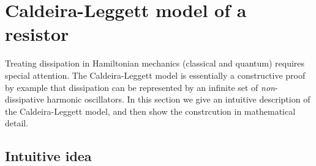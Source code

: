 \section{Caldeira-Leggett model of a resistor} \label{sec:ch.decoherence:caldeira-leggett}


Treating dissipation in Hamiltonian mechanics (classical and quantum) requires special attention.
The Caldeira-Leggett model is essentially a constructive proof by example that dissipation can be represented by an infinite set of \emph{non}-dissipative harmonic oscillators.
In this section we give an intuitive description of the Caldeira-Leggett model, and then show the constrcution in mathematical detail.

\subsection{Intuitive idea}

